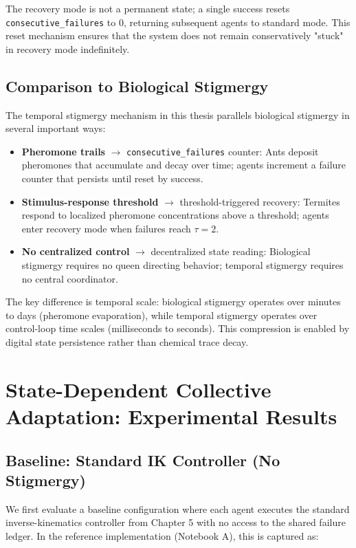 ﻿\documentclass[12pt,a4paper,oneside]{report}
\begin{document}
The recovery mode is not a permanent state; a single success resets \texttt{consecutive\_failures} to 0, returning subsequent agents to standard mode. This reset mechanism ensures that the system does not remain conservatively "stuck" in recovery mode indefinitely.

\subsection{Comparison to Biological Stigmergy}

The temporal stigmergy mechanism in this thesis parallels biological stigmergy in several important ways:

\begin{itemize}
    \item \textbf{Pheromone trails} $\rightarrow$ \texttt{consecutive\_failures} counter: Ants deposit pheromones that accumulate and decay over time; agents increment a failure counter that persists until reset by success.
    \item \textbf{Stimulus-response threshold} $\rightarrow$ threshold-triggered recovery: Termites respond to localized pheromone concentrations above a threshold; agents enter recovery mode when failures reach $\tau = 2$.
    \item \textbf{No centralized control} $\rightarrow$ decentralized state reading: Biological stigmergy requires no queen directing behavior; temporal stigmergy requires no central coordinator.
\end{itemize}

The key difference is temporal scale: biological stigmergy operates over minutes to days (pheromone evaporation), while temporal stigmergy operates over control-loop time scales (milliseconds to seconds). This compression is enabled by digital state persistence rather than chemical trace decay.

\section{State-Dependent Collective Adaptation: Experimental Results}

\subsection{Baseline: Standard IK Controller (No Stigmergy)}

We first evaluate a baseline configuration where each agent executes the standard inverse-kinematics controller from Chapter 5 with no access to the shared failure ledger. In the reference implementation (Notebook A), this is captured as:
\end{document}
